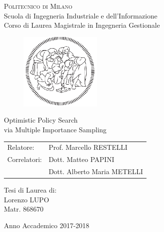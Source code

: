 \begin{titlepage}

	\begin{center}
		\normalsize
			\textsc{Politecnico di Milano}\\
			Scuola di Ingegneria Industriale e dell'Informazione\\
      		Corso di Laurea Magistrale in Ingegneria Gestionale\\
	\end{center}
	\vspace{.6cm}

	\begin{figure}[htpb]
		\centering
		\includegraphics[width=4cm]{Cover/polimi}
	\end{figure}
	\vspace{.6cm}

	\begin{center}
		\LARGE
			Optimistic Policy Search \\
			via Multiple Importance Sampling
	\end{center}
	\vspace{1.6cm}

	\begin{flushleft}
		\large
		\begin{tabular}{ll}
		Relatore:    & Prof. Marcello RESTELLI      \\
		Correlatori: & Dott. Matteo PAPINI \\
					 & Dott. Alberto Maria METELLI
		\end{tabular}
		\vspace{1cm}
	\end{flushleft}

	\begin{flushright}
		\large
		Tesi di Laurea di:\\
		Lorenzo LUPO\\
		Matr. 868670\\
	\end{flushright}

	\vspace*{\fill}
	\begin{center}
		Anno Accademico 2017-2018
	\end{center}

\end{titlepage}

